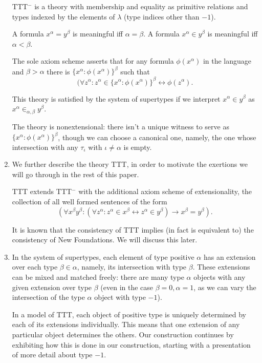 \documentclass[12pt]{article}
\begin{document}
\begin{enumerate}
TTT$^-$ is a theory with membership and equality as primitive relations and types indexed by the elements of $\lambda$ (type indices other than $-1$).

A formula $x^\alpha = y^\beta$ is meaningful iff $\alpha=\beta$.  A formula $x^\alpha \in y^\beta$ is meaningful iff $\alpha<\beta$.

The sole axiom scheme asserts that for any formula $\phi(x^\alpha)$ in the language and $\beta>\alpha$ there is $\{x^\alpha:\phi(x^\alpha)\}^\beta$ such that
$$(\forall z^\alpha:z^\alpha \in \{x^\alpha:\phi(x^\alpha)\}^\beta \leftrightarrow \phi(z^\alpha).$$

This theory is satisfied by the system of supertypes if we interpret $x^\alpha \in y^\beta$ as $x^\alpha \in_{\alpha,\beta} y^\beta$.

The theory is nonextensional:  there isn't a unique witness to serve as $\{x^\alpha:\phi(x^\alpha)\}^\beta$, though we can choose a canonical one, namely, the one whose intersection
with any $\tau_\iota$ with $\iota \neq \alpha$ is empty.

\item We further describe the theory TTT, in order to motivate the exertions we will go through in the rest of this paper.

TTT extends TTT$^-$ with the additional axiom scheme of extensionality, the collection of all well formed sentences of the form $$(\forall x^\beta y^\beta:(\forall z^\alpha:z^\alpha \in x^\beta \leftrightarrow z^\alpha \in y^\beta)\rightarrow x^\beta=y^\beta).$$

It is known that the consistency of TTT implies (in fact is equivalent to) the consistency of New Foundations.  We will discuss this later.

\item In the system of supertypes, each element of type positive $\alpha$ has an extension over each type $\beta\in \alpha$, namely, its intersection with type $\beta$.  These extensions can be mixed and matched freely:  there are many type $\alpha$ objects with any given extension over type $\beta$ (even in the case $\beta=0, \alpha=1$, as we can vary the intersection of
the type $\alpha$ object with type $-1$).

 In a model of TTT, each object of positive type is uniquely determined by each of its extensions individually.  This means that one extension of any particular object determines the others.
Our construction continues by exhibiting how this is done in our construction, starting with a presentation of more detail about type $-1$.


\end{enumerate}
\end{document}
